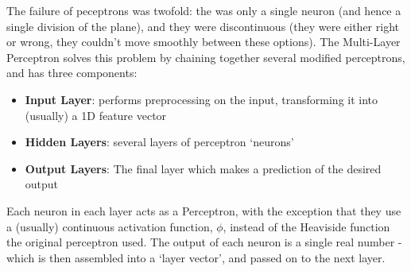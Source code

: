 \documentclass[10pt, twocolumn]{article}
\renewcommand\vec[1]{\boldsymbol{\textbf{#1}}}
\newcommand\cec[1]{\tilde{\vec{#1}}}
\begin{document}
\begin{figure*}[t]
\begin{center}
		
		\end{center}
	\end{figure*}
		The failure of peceptrons was twofold: the was only a single neuron (and hence a single division of the plane), and they were discontinuous (they were either right or wrong, they couldn't move smoothly between these options). The Multi-Layer Perceptron solves this problem by chaining together several modified perceptrons, and has three components:

		\begin{itemize}
			\item \textbf{Input Layer}: performs preprocessing on the input, transforming it into (usually) a 1D feature vector
			\item \textbf{Hidden Layers}: several layers of perceptron `neurons'
			\item \textbf{Output Layers}: The final layer which makes a prediction of the desired output
		\end{itemize}
		
		Each neuron in each layer acts as a Perceptron, with the exception that they use a (usually) continuous activation function, $\phi$, instead of the Heaviside function the original perceptron used. The output of each neuron is a single real number - which is then assembled into a `layer vector', and passed on to the next layer.
		
\end{document}
